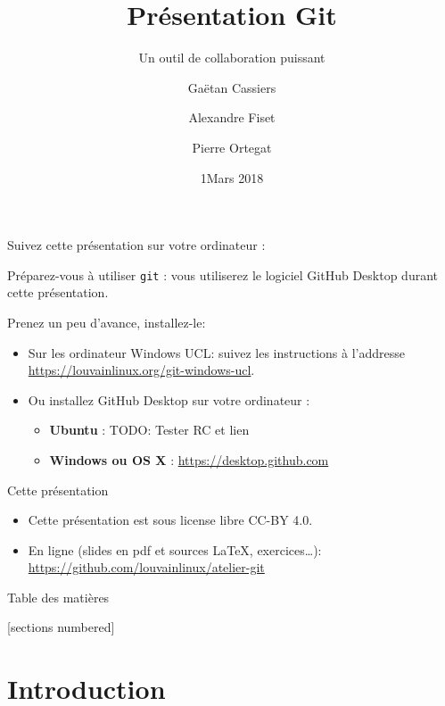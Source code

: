 \documentclass{beamer}
\title{Présentation Git}
\subtitle{Un outil de collaboration puissant}
\date{1\ier Mars 2018}
\author{Gaëtan Cassiers \and Alexandre Fiset \and Pierre Ortegat}
\institute{KAP Louvain-li-Nux}
\begin{document}
\begin{frame}
\begin{center}
  Suivez cette présentation sur votre ordinateur :

\end{center}

Préparez-vous à utiliser \texttt{git} :
vous utiliserez le logiciel GitHub Desktop durant cette présentation.

Prenez un peu d'avance, installez-le:
\begin{itemize}
    \item Sur les ordinateur Windows UCL: suivez les instructions à l'addresse \url{https://louvainlinux.org/git-windows-ucl}.
    \item Ou installez GitHub Desktop sur votre ordinateur :
    \begin{itemize}
        \item \textbf{Ubuntu} : TODO: Tester RC et lien
        \item \textbf{Windows ou OS X} : \url{https://desktop.github.com}
    \end{itemize}
\end{itemize}
\end{frame}


\maketitle

\begin{frame}{Cette présentation}
    \begin{itemize}
        \item Cette présentation est sous license libre CC-BY 4.0.
        \item En ligne (slides en pdf et sources \LaTeX, exercices\ldots):
            \url{https://github.com/louvainlinux/atelier-git}
    \end{itemize}
\end{frame}

\begin{frame}{Table des matières}

[sections numbered]
\tableofcontents[hideallsubsections]

\end{frame}

\section{Introduction}
\end{document}
